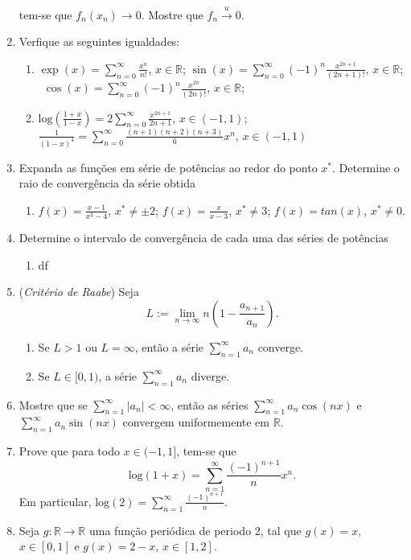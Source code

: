 \documentclass{article}
\theoremstyle{plain}
\theoremstyle{definition}
\theoremstyle{remark}
\begin{document}
\begin{enumerate}
  tem-se que $f_{n}(x_{n})\rightarrow 0$. 
  Mostre que $f_{n} \xrightarrow{u} 0$. 
  \item Verfique as seguintes igualdades: 
    \begin{enumerate}
    \item $\exp(x)=\sum_{n=0}^{\infty} \frac{x^n}{n!}$, $x \in \mathbb{R}$;
    $\sin(x)=\sum_{n=0}^{\infty} (-1)^{n}\frac{x^{2n+1}}{(2n+1)!}$, $x \in \mathbb{R}$;
           $\ \ \cos(x)=\sum_{n=0}^{\infty} (-1)^{n}\frac{x^{2n}}{(2n)!}$, $x \in \mathbb{R}$;
     \item $\text{log}(\frac{1+x}{1-x})=2\sum_{n=0}^{\infty} \frac{x^{2n+1}}{2n+1}$, $x \in (-1,1)$;
    $\frac{1}{(1-x)^{4}}=\sum_{n=0}^{\infty} \frac{(n+1)(n+2)(n+3)}{6} x^n$, $x \in (-1,1)$     
    \end{enumerate}
 \item Expanda as funções em série de potências ao redor do ponto $x^*$.
 Determine o raio de convergência da série obtida
   \begin{enumerate}
    \item $f(x)=\frac{x-1}{x^2-4}$, $x^{*}\neq \pm2$; 
          $f(x)=\frac{x}{x-3}$, $x^{*}\neq 3$;
          $f(x)=tan(x)$, $x^{*}\neq 0$.
   \end{enumerate}       
 \item Determine o intervalo de convergência de cada uma das séries de potências
   \begin{enumerate}
   \item df
   \end{enumerate}     
 \item ({\it Critério de Raabe}) Seja 
 $$L:=\lim_{n \rightarrow \infty } n(1-\frac{a_{n+1}}{a_n}).$$  
   \begin{enumerate}
   \item Se $L>1$ ou $L=\infty$, então a série 
   $\sum_{n=1}^{\infty}a_{n}$ converge.
   \item Se $L \in [0,1)$, a série $\sum_{n=1}^{\infty}a_{n}$ diverge.
   \end{enumerate}
  \item Mostre que se $\sum_{n=1}^{\infty} |a_{n}|<\infty$, então 
  as séries $\sum_{n=1}^{\infty} a_{n}\cos(nx)$ e  
   $\sum_{n=1}^{\infty} a_{n}\sin(nx)$  convergem uniformemente em 
   $\mathbb{R}$.
   \item Prove que para todo $x \in (-1,1]$, tem-se que 
   $$ \text{log}(1+x)=\sum_{n=1}^{\infty} \frac{(-1)^{n+1}}{n}x^n.$$
   Em particular, $\text{log}(2)=\sum_{n=1}^{\infty} \frac{(-1)^{n+1}}{n}$.
  \item Seja $g:\mathbb{R}\rightarrow\mathbb{R}$ uma função periódica de periodo 2, tal que    $g(x)=x$, $x \in [0,1]$ e $g(x)=2-x$, $x \in [1,2]$. 

\end{enumerate}
\end{document}
